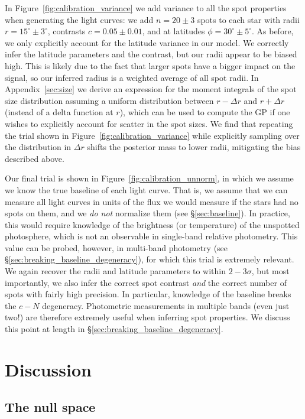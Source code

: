 \documentclass[modern]{aastex62}
\begin{document}
In Figure~\ref{fig:calibration_variance} we add variance to all the spot
properties when generating the light curves: we add $n = 20 \pm 3$ spots
to each star with radii $r = 15^\circ \pm 3^\circ$, contrasts
$c = 0.05 \pm 0.01$, and at latitudes $\phi = 30^\circ \pm 5^\circ$.
As before, we only explicitly account for the latitude variance in our
model. We correctly infer the latitude parameters and the contrast, but
our radii appear to be biased high. This is likely due to the fact that
larger spots have a bigger impact on the signal, so our inferred radius
is a weighted average of all spot radii. In Appendix~\ref{sec:size} we
derive an expression for the moment integrals of the spot size distribution
assuming a uniform distribution between $r - \Delta r$ and $r + \Delta r$
(instead of a delta function at $r$), which can be used to compute the
GP if one wishes to explicitly account for scatter in the spot sizes.
We find that repeating the trial shown in Figure~\ref{fig:calibration_variance}
while explicitly sampling over the distribution in $\Delta r$ shifts the
posterior mass to lower radii, mitigating the bias described above.

Our final trial is shown in Figure~\ref{fig:calibration_unnorm}, in which
we assume we know the true baseline of each light curve. That is, we
assume that we can measure all light curves in units of the flux we would
measure if the stars had no spots on them, and we \emph{do not}
normalize them (see \S\ref{sec:baseline}). In practice, this would require
knowledge of the brightness (or temperature) of the unspotted
photosphere, which is not an observable in single-band relative photometry.
This value can be probed, however, in multi-band photometry
(see \S\ref{sec:breaking_baseline_degeneracy}), for which this trial is
extremely relevant. We again recover the radii and latitude parameters
to within $2-3\sigma$, but most importantly, we also infer the correct
spot contrast \emph{and} the correct number of spots with fairly high
precision. In particular, knowledge of the baseline breaks the $c-N$ degeneracy.
Photometric measurements in multiple bands (even just two!)
are therefore extremely useful when inferring spot properties.
We discuss this point at length in \S\ref{sec:breaking_baseline_degeneracy}.

\section{Discussion}
\label{sec:discussion}


\subsection{The null space}
\label{sec:nullspace}
\end{document}
